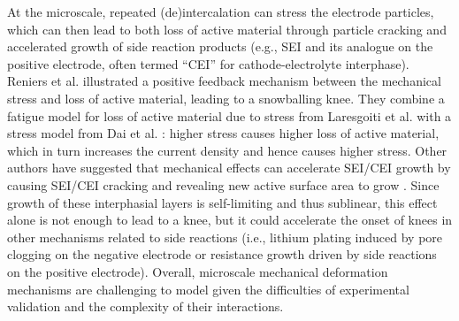 \documentclass[journal=jpclcd,manuscript=article]{achemso}
\begin{document}
At the microscale, repeated (de)intercalation can stress the electrode particles, which can then lead to both loss of active material through particle cracking and accelerated growth of side reaction products (e.g., SEI and its analogue on the positive electrode, often termed ``CEI'' for cathode-electrolyte interphase).
Reniers et al. \cite{reniers_review_2019} illustrated a positive feedback mechanism between the mechanical stress and loss of active material, leading to a snowballing knee. They combine a fatigue model for loss of active material due to stress from Laresgoiti et al. \cite{laresgoiti_modeling_2015} with a stress model from Dai et al. \cite{dai_simulation_2014}: higher stress causes higher loss of active material, which in turn increases the current density and hence causes higher stress.
Other authors have suggested that mechanical effects can accelerate SEI/CEI growth by causing SEI/CEI cracking and revealing new active surface area to grow \cite{pinson_theory_2013,kupper_end--life_2018,louli_operando_2019, jana_physical_2019}. Since growth of these interphasial layers is self-limiting and thus sublinear\cite{bloom_accelerated_2001, broussely_aging_2001, wright_calendar-_2002, smith_high_2011, attia_revisiting_2020}, this effect alone is not enough to lead to a knee, but it could accelerate the onset of knees in other mechanisms related to side reactions (i.e., lithium plating induced by pore clogging on the negative electrode \cite{lewerenz_post-mortem_2017} or resistance growth driven by side reactions on the positive electrode\cite{ma_editors_2019, jana_physical_2019}).
Overall, microscale mechanical deformation mechanisms are challenging to model given the difficulties of experimental validation and the complexity of their interactions.
\end{document}
